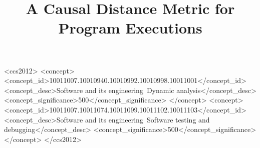 \documentclass{sig-alternate-05-2015}
\author{}
\begin{document}
\title{A Causal Distance Metric for Program Executions}

%
%


\maketitle

\begin{abstract}

\end{abstract}

\begin{CCSXML}
<ccs2012>
<concept>
<concept_id>10011007.10010940.10010992.10010998.10011001</concept_id>
<concept_desc>Software and its engineering~Dynamic analysis</concept_desc>
<concept_significance>500</concept_significance>
</concept>
<concept>
<concept_id>10011007.10011074.10011099.10011102.10011103</concept_id>
<concept_desc>Software and its engineering~Software testing and debugging</concept_desc>
<concept_significance>500</concept_significance>
</concept>
</ccs2012>
\end{CCSXML}


\printccsdesc











\end{document}
